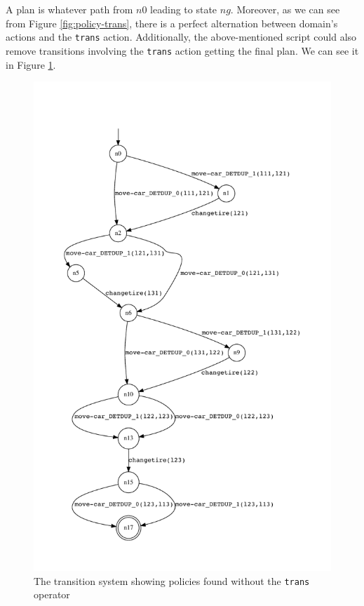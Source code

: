 A plan is whatever path from $n0$ leading to state $ng$. 
Moreover, as we can see from Figure \ref{fig:policy-trans}, there is a perfect alternation between domain's actions and the \texttt{trans} action. Additionally, the above-mentioned script could also remove transitions involving the \texttt{trans} action getting the final plan. We can see it in Figure \ref{fig:policy-no-trans}.

\begin{figure}[h]
\centering
\includegraphics[]{images/graph-policy1}
\caption{The transition system showing policies found without the \texttt{trans} operator} 
\label{fig:policy-no-trans}
\end{figure}


